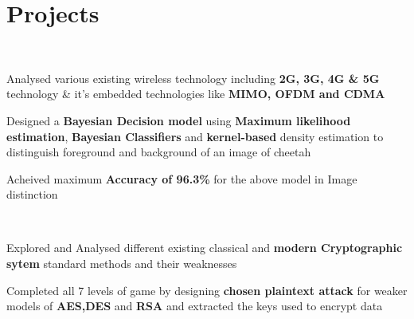 \documentclass[]{deedy-resume-openfont}
\begin{document}
\begin{minipage}[t]{0.66\textwidth}
\section{Projects}
\\
\begin{tightemize}
\item Analysed various existing wireless technology including \textbf{2G, 3G, 4G \& 5G} technology \& it’s
embedded technologies like \textbf{MIMO, OFDM and CDMA}
\item Designed a \textbf{Bayesian Decision model} using \textbf{Maximum likelihood estimation}, \textbf{Bayesian Classifiers} and \textbf{kernel-based} density estimation to distinguish foreground and background of an image of cheetah
\item Acheived maximum \textbf{Accuracy of 96.3\%} for the above model in Image distinction
\end{tightemize}
\\
\begin{tightemize}
	\item Explored and Analysed different existing classical and \textbf{modern Cryptographic sytem} standard methods and their weaknesses
	\item Completed all 7 levels of game by designing \textbf{chosen plaintext attack} for weaker models of \textbf{AES,DES} and \textbf{RSA} and extracted the keys used to encrypt data
\end{tightemize}

\end{minipage}
\end{document}
